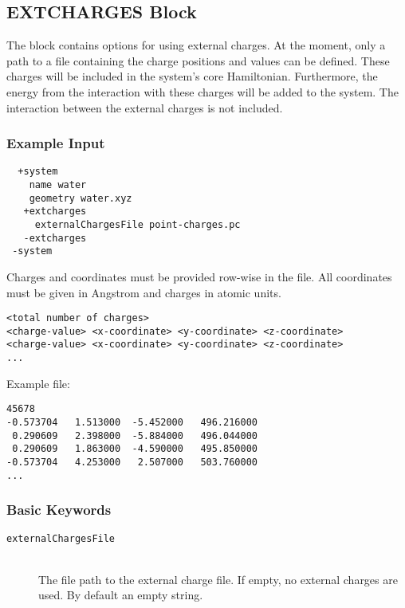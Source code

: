 \subsection{EXTCHARGES Block}\label{sec:system:extchrg}
The  block contains options for using external charges. At the moment, only a path
to a file containing the charge positions and values can be defined. These charges will be included in
the system's core Hamiltonian. Furthermore, the energy from the interaction with these charges will be added to
the system. The interaction between the external charges is not included.
\subsubsection{Example Input}
\begin{lstlisting}
  +system
    name water
    geometry water.xyz
   +extcharges
     externalChargesFile point-charges.pc
   -extcharges
 -system
\end{lstlisting}
Charges and coordinates must be provided row-wise in the file. All coordinates must be given in Angstrom and charges
in atomic units.
\begin{lstlisting}
<total number of charges>
<charge-value> <x-coordinate> <y-coordinate> <z-coordinate>
<charge-value> <x-coordinate> <y-coordinate> <z-coordinate>
...
\end{lstlisting}
Example file:
\begin{lstlisting}
45678
-0.573704   1.513000  -5.452000   496.216000
 0.290609   2.398000  -5.884000   496.044000
 0.290609   1.863000  -4.590000   495.850000
-0.573704   4.253000   2.507000   503.760000
...
\end{lstlisting}
\subsubsection{Basic Keywords}
\begin{description}
  \item [\texttt{externalChargesFile}]\hfill \\
  The file path to the external charge file. If empty, no external charges are used. By default an empty string.
\end{description}
